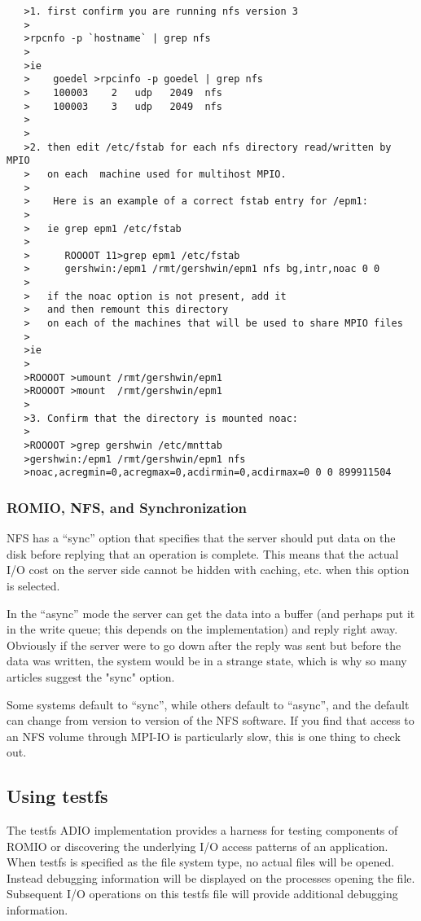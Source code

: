 \begin{verbatim}   
   >1. first confirm you are running nfs version 3
   >
   >rpcnfo -p `hostname` | grep nfs
   >
   >ie 
   >    goedel >rpcinfo -p goedel | grep nfs
   >    100003    2   udp   2049  nfs
   >    100003    3   udp   2049  nfs
   >
   >
   >2. then edit /etc/fstab for each nfs directory read/written by MPIO
   >   on each  machine used for multihost MPIO.
   >
   >    Here is an example of a correct fstab entry for /epm1:
   >
   >   ie grep epm1 /etc/fstab
   > 
   >      ROOOOT 11>grep epm1 /etc/fstab
   >      gershwin:/epm1 /rmt/gershwin/epm1 nfs bg,intr,noac 0 0
   >
   >   if the noac option is not present, add it 
   >   and then remount this directory
   >   on each of the machines that will be used to share MPIO files
   >
   >ie
   >
   >ROOOOT >umount /rmt/gershwin/epm1
   >ROOOOT >mount  /rmt/gershwin/epm1
   >
   >3. Confirm that the directory is mounted noac:
   >
   >ROOOOT >grep gershwin /etc/mnttab 
   >gershwin:/epm1 /rmt/gershwin/epm1 nfs
   >noac,acregmin=0,acregmax=0,acdirmin=0,acdirmax=0 0 0 899911504
\end{verbatim}

\subsubsection{ROMIO, NFS, and Synchronization}

NFS has a ``sync'' option that specifies that the server should put data on
the disk before replying that an operation is complete.  This means that
the actual I/O cost on the server side cannot be hidden with caching,
etc. when this option is selected.
                                                                                
In the ``async'' mode the server can get the data into a buffer (and
perhaps put it in the write queue; this depends on the implementation)
and reply right away.  Obviously if the server were to go down after the
reply was sent but before the data was written, the system would be in
a strange state, which is why so many articles suggest the "sync" option.

Some systems default to ``sync'', while others default to ``async'',
and the default can change from version to version of the NFS software.  If
you find that access to an NFS volume through MPI-IO is particularly slow,
this is one thing to check out.


\subsection{Using testfs}
The testfs ADIO implementation provides a harness for testing components
of ROMIO or discovering the underlying I/O access patterns of an
application.  When testfs is specified as the file system type, no
actual files will be opened.  Instead debugging information will be
displayed on the processes opening the file.  Subsequent I/O operations
on this testfs file will provide additional debugging information.

